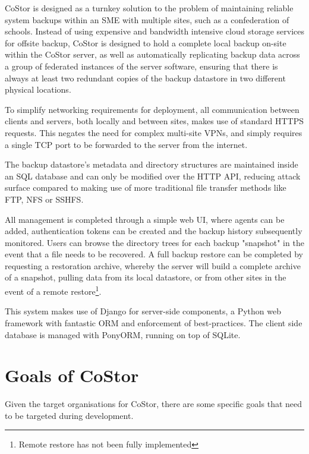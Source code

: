 \documentclass[bsc,frontabs,twoside,singlespacing,parskip,deptreport]{infthesis}     %
\begin{document}
CoStor is designed as a turnkey solution to the problem of maintaining reliable system
backups within an SME with multiple sites, such as a confederation of schools. Instead
of using expensive and bandwidth intensive cloud storage services for offsite backup, 
CoStor is designed to hold a complete local backup on-site within the CoStor server, as
well as automatically replicating backup data across a group of federated instances of
the server software, ensuring that there is always at least two redundant copies of the
backup datastore in two different physical locations.

To simplify networking requirements for deployment, all communication between clients 
and servers, both locally and between sites, makes use of standard HTTPS requests. This 
negates the need for complex multi-site VPNs, and simply requires a single TCP port to
be forwarded to the server from the internet.

The backup datastore's metadata and directory structures are maintained inside an SQL
database and can only be modified over the HTTP API, reducing attack surface
compared to making use of more traditional file transfer methods like FTP, NFS or 
SSHFS.

All management is completed through a simple web UI, where agents can be added, 
authentication tokens can be created and the backup history subsequently monitored. 
Users can browse the directory trees for each backup "snapshot" in the event that a file 
needs to be recovered. A full backup restore can be completed by requesting a restoration 
archive, whereby the server will build a complete archive of a snapshot, pulling data from its
local datastore, or from other sites in the event of a remote restore\footnote{Remote restore 
has not been fully implemented}.

This system makes use of Django for server-side components, a Python web framework with
fantastic ORM and enforcement of best-practices. The client side database is managed with
PonyORM, running on top of SQLite.

\clearpage

\section{Goals of CoStor}

Given the target organisations for CoStor, there are some specific goals that need to be 
targeted during development.
\end{document}
